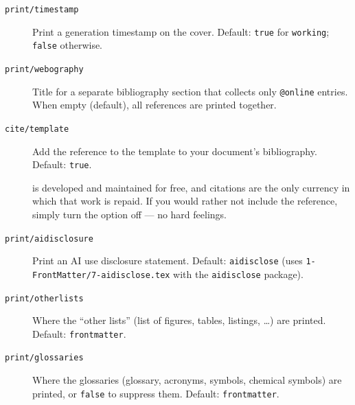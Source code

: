 \begin{description}
  \item[\texttt{print/timestamp}] Print a generation timestamp on the cover.
    Default: \texttt{true} for \texttt{working}; \texttt{false} otherwise.
\begin{latexcode}
\end{latexcode}

  \item[\texttt{print/webography}] Title for a separate bibliography section
    that collects only \texttt{@online} entries.  When empty (default), all
    references are printed together.
\begin{latexcode}
\end{latexcode}

  \item[\texttt{cite/template}] Add the reference to the \novathesis{} template
    to your document's bibliography.  Default: \texttt{true}.

    \novathesis{} is developed and maintained for free, and citations are the
    only currency in which that work is repaid.  If you would rather not
    include the reference, simply turn the option off --- no hard feelings.
\begin{latexcode}
\end{latexcode}

  \item[\texttt{print/aidisclosure}] Print an AI use disclosure statement.
    Default: \texttt{aidisclose} (uses \verb!1-FrontMatter/7-aidisclose.tex!
    with the \texttt{aidisclose} package).
\begin{latexcode}
\end{latexcode}

  \item[\texttt{print/otherlists}] Where the ``other lists'' (list of
    figures, tables, listings, \ldots) are printed.
    Default: \texttt{frontmatter}.
\begin{latexcode}
\end{latexcode}

  \item[\texttt{print/glossaries}] Where the glossaries (glossary, acronyms,
    symbols, chemical symbols) are printed, or \texttt{false} to suppress
    them.  Default: \texttt{frontmatter}.
\begin{latexcode}
\end{latexcode}


\end{description}
